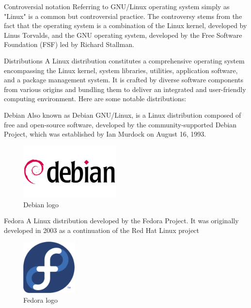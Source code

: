 \documentclass{beamer}
\begin{document}
\begin{frame}{Controversial notation}
		Referring to GNU/Linux operating system simply as "Linux" is a common but controversial
		practice. The controversy stems from the fact that the operating system is a combination 
		of the Linux kernel, developed by Linus Torvalds, and the GNU operating system, developed 
		by the Free Software Foundation (FSF) led by Richard Stallman.
\end{frame}

\begin{frame}{Distributions}
		A Linux distribution constitutes a comprehensive operating system encompassing the Linux kernel,
		system libraries, utilities, application software, and a package management system. It is crafted
		by diverse software components from various origins and bundling them to deliver an
		integrated and user-friendly computing environment.
		Here are some notable distributions:
\end{frame}

\begin{frame}{Debian}
		Also known as Debian GNU/Linux, is a Linux distribution composed of free and open-source 
		software, developed by the community-supported Debian Project, which was established by 
		Ian Murdock on August 16, 1993.
		\begin{figure}
			\begin{center}
				\includegraphics[width=0.45\textwidth]{images/debian-logo.jpg}
			\end{center}
			\caption{Debian logo}
		\end{figure}
		
\end{frame}

\begin{frame}{Fedora}
		A Linux distribution developed by the Fedora Project. It was originally
		developed in 2003 as a continuation of the Red Hat Linux project
		\begin{figure}
			\begin{center}
				\includegraphics[width=0.25\textwidth]{images/fedora-logo.png}
			\end{center}
			\caption{Fedora logo}
		\end{figure}
\end{frame}
\end{document}
